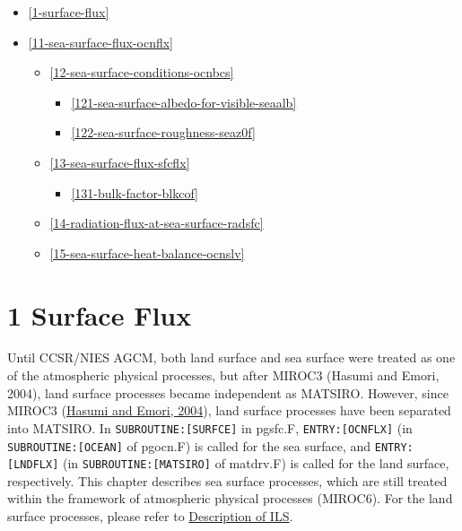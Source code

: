 \begin{itemize}
\tightlist
\item
  \ref{1-surface-flux}
\item
  \ref{11-sea-surface-flux-ocnflx}

  \begin{itemize}
  \tightlist
  \item
    \ref{12-sea-surface-conditions-ocnbcs}

    \begin{itemize}
    \tightlist
    \item
      \ref{121-sea-surface-albedo-for-visible-seaalb}
    \item
      \ref{122-sea-surface-roughness-seaz0f}
    \end{itemize}
  \item
    \ref{13-sea-surface-flux-sfcflx}

    \begin{itemize}
    \tightlist
    \item
      \ref{131-bulk-factor-blkcof}
    \end{itemize}
  \item
    \ref{14-radiation-flux-at-sea-surface-radsfc}
  \item
    \ref{15-sea-surface-heat-balance-ocnslv}
  \end{itemize}
\end{itemize}

\hypertarget{surface-flux}{%
\section{1 Surface Flux}\label{surface-flux}}

Until CCSR/NIES AGCM, both land surface and sea surface were treated as
one of the atmospheric physical processes, but after MIROC3 (Hasumi and
Emori, 2004), land surface processes became independent as MATSIRO.
However, since MIROC3
(\href{https://ccsr.aori.u-tokyo.ac.jp/~hasumi/miroc_description.pdf}{Hasumi
and Emori, 2004}), land surface processes have been separated into
MATSIRO. In \texttt{SUBROUTINE:{[}SURFCE{]}} in pgsfc.F,
\texttt{ENTRY:{[}OCNFLX{]}} (in \texttt{SUBROUTINE:{[}OCEAN{]}} of
pgocn.F) is called for the sea surface, and \texttt{ENTRY:{[}LNDFLX{]}}
(in \texttt{SUBROUTINE:{[}MATSIRO{]}} of matdrv.F) is called for the
land surface, respectively. This chapter describes sea surface
processes, which are still treated within the framework of atmospheric
physical processes (MIROC6). For the land surface processes, please
refer to
\href{https://github.com/integrated-land-simulator/model_description}{Description
of ILS}.

